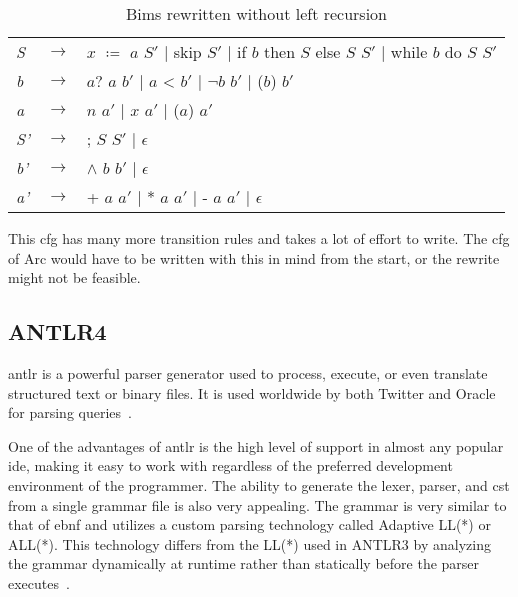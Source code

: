\begin{table}[htb!]
  \centering
  \begin{tabular}{lll}
    \textit{S}  & $\to$ & $x$ $\coloneqq$ $a$ $S'$
    $\mid$  skip $S'$
    $\mid$  if $b$ then $S$ else $S$ $S'$
    $\mid$  while $b$ do $S$ $S'$                             \\
    \textit{b}  & $\to$ & $a?$ $a$ $b'$
    $\mid$  $a$ < $b'$
    $\mid$  $\neg b$ $b'$
    $\mid$  ($b$) $b'$                                        \\
    \textit{a}  & $\to$ & $n$ $a'$
    $\mid$  $x$ $a'$
    $\mid$  ($a$) $a'$                                        \\
    \textit{S'} & $\to$ & ; $S$ $S'$
    $\mid$  $\epsilon$                                        \\
    \textit{b'} & $\to$ & $\land$ $b$ $b'$ $\mid$  $\epsilon$ \\
    \textit{a'} & $\to$ & + $a$ $a'$
    $\mid$  * $a$ $a'$
    $\mid$  - $a$ $a'$
    $\mid$  $\epsilon$                                        \\
  \end{tabular}
  \caption{Bims rewritten without left recursion}
  \label{tab:bimsrewrite}
\end{table}


This \gls{cfg} has many more transition rules and takes a lot of effort to write. The \gls{cfg} of Arc would have to be written with this in mind from the start, or the rewrite might not be feasible.

\subsection{ANTLR4}
\gls{antlr} is a powerful parser generator used to process, execute, or even translate structured text or binary files. It is used worldwide by both Twitter and Oracle for parsing queries~\cite{ANTLR_About}.

One of the advantages of \gls{antlr} is the high level of support in almost any popular \gls{ide}, making it easy to work with regardless of the preferred development environment of the programmer. The ability to generate the lexer, parser, and \gls{cst} from a single grammar file is also very appealing. The grammar is very similar to that of \gls{ebnf} and utilizes a custom parsing technology called Adaptive LL(*) or ALL(*). This technology differs from the LL(*) used in ANTLR3 by analyzing the grammar dynamically at runtime rather than statically before the parser executes~\cite{Parr2014}.

